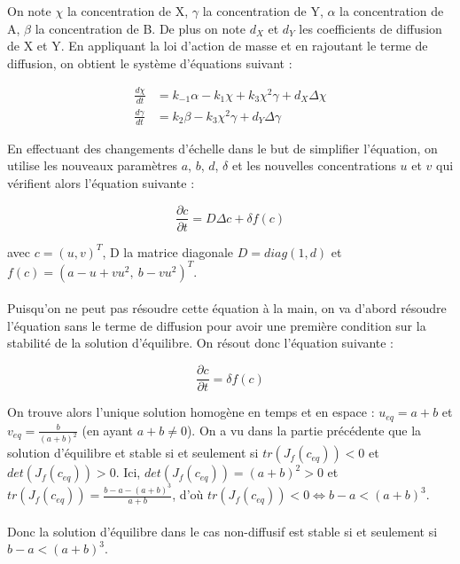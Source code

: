 \documentclass[12pt,a4paper]{article}
\begin{document}
On note $\chi$ la concentration de X, $\gamma$ la concentration de Y, $\alpha$ la concentration de A, $\beta$ la concentration de B. De plus on note $d_{X}$ et $d_{Y}$ les coefficients de diffusion de X et Y.
En appliquant la loi d'action de masse et en rajoutant le terme de diffusion, on obtient le système d'équations suivant :

\begin{equation}
\begin{split}
    \frac{d\chi}{dt} & = k_{-1} \alpha - k_{1} \chi + k_{3} \chi^{2} \gamma + d_{X} \Delta \chi \\
    \frac{d\gamma}{dt} & = k_{2} \beta - k_{3} \chi^{2} \gamma + d_{Y} \Delta \gamma
\end{split}
\end{equation}

En effectuant des changements d'échelle dans le but de simplifier l'équation, on utilise les nouveaux paramètres $a$, $b$, $d$, $\delta$ et les nouvelles concentrations $u$ et $v$ qui vérifient alors l'équation suivante :

\begin{equation}
    \frac{\partial c}{\partial t} = D \Delta c + \delta f(c)
\end{equation}

avec $c = (u,v)^{T}$, D la matrice diagonale $D = diag(1,d)$ et $f(c) = (a - u + vu^{2}, \ b-vu^{2})^{T}$.
\\ \\
Puisqu'on ne peut pas résoudre cette équation à la main, on va d'abord résoudre l'équation sans le terme de diffusion pour avoir une première condition sur la stabilité de la solution d'équilibre. On résout donc l'équation suivante :

\begin{equation}
    \frac{\partial c}{\partial t} = \delta f(c)
\end{equation}

On trouve alors l'unique solution homogène en temps et en espace : $u_{eq} = a+ b$ et $v_{eq} = \frac{b}{(a+ b)^{2}}$ (en ayant $a+b \neq 0$). On a vu dans la partie précédente que la solution d'équilibre et stable si et seulement si $tr(J_{f}(c_{eq})) < 0$ et $det(J_{f}(c_{eq})) > 0$. Ici, $det(J_{f}(c_{eq})) = (a+b)^{2} > 0$ et $tr(J_{f}(c_{eq})) = \frac{b-a-(a+b)^{3}}{a+b}$, d'où $tr(J_{f}(c_{eq})) < 0 \Leftrightarrow b-a<(a+b)^{3}$. \\ \\
Donc la solution d'équilibre dans le cas non-diffusif est stable si et seulement si $b-a<(a+b)^{3}$.
\end{document}
